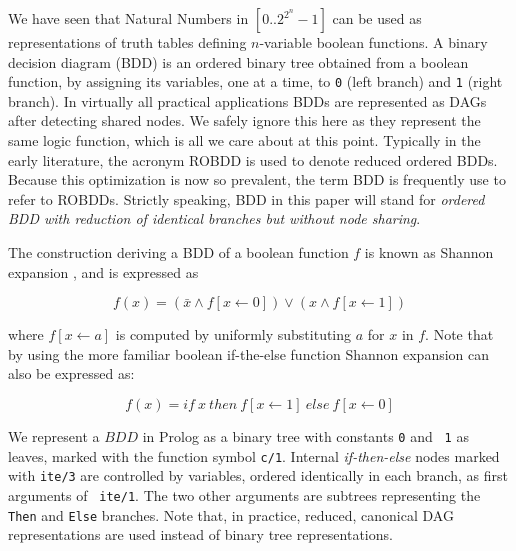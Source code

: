 \documentclass[]{INCLUDES/llncs}
\begin{document}
We have seen that Natural Numbers in $[0..2^{2^n}-1]$ can be used as
representations of truth tables defining $n$-variable boolean functions.
A binary decision diagram (BDD)
\cite{bryant86graphbased} is an ordered binary tree obtained from 
a boolean function, by assigning its variables, one at a time, 
to {\tt 0}  (left branch) and {\tt 1} (right branch).
In virtually all practical applications BDDs are represented as DAGs after
detecting shared nodes. We safely ignore this here
as they represent the same logic
function, which is all we care about at this point. 
Typically in the early literature, the acronym
ROBDD is used to denote reduced ordered BDDs. Because this
optimization is now so prevalent, 
the term BDD is frequently use to refer to
ROBDDs. Strictly speaking, BDD in this paper will stand for {\em ordered BDD
with reduction of identical branches but without node sharing}.

The construction deriving a BDD of a boolean function $f$ is known as Shannon
expansion \cite{shannon_all}, and is expressed as

\begin{equation}
f(x)= (\bar{x} \wedge f[x \leftarrow 0]) \vee (x \wedge f[x \leftarrow 1])
\end{equation}

\noindent where $f[x \leftarrow a]$ is computed 
by uniformly substituting $a$ for $x$ in $f$. Note that by using the more
familiar boolean if-the-else function Shannon expansion can also
 be expressed as:

\begin{equation}
f(x) = if~x~then~f[x \leftarrow 1]~else~f[x \leftarrow 0]
\end{equation}

We represent a $BDD$ in Prolog as a binary tree with constants {\tt 0} and {\tt
1} as leaves, marked with the function symbol {\tt c/1}. Internal
{\em if-then-else} nodes marked with {\tt ite/3} are controlled by
variables, ordered identically in each branch, as first arguments of {\tt
ite/1}. The two other arguments are subtrees representing the {\tt Then} 
and {\tt Else} branches. Note that, in practice, reduced, 
canonical DAG representations are used instead of
binary tree representations.
\end{document}
